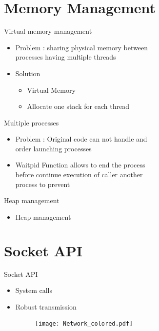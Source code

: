 \documentclass{beamer}
\begin{document}
\section{Memory Management}
\begin{frame}{Virtual memory management}
  \begin{itemize}
	\item Problem : sharing physical memory between 
	\\processes having multiple threads
    \item Solution  
    \begin{itemize}
    \item Virtual Memory 
    \item Allocate one stack for each thread
  \end{itemize}
\end{itemize}
  
\end{frame}
\begin{frame}{Multiple processes}
  \begin{itemize}
	\item Problem : Original code can not handle and
	\\order launching processes
    \item Waitpid Function allows to end the process 
    \\before continue execution of caller another
    \\process to prevent
    
  \end{itemize}
\end{frame}
\begin{frame}{Heap management}
  \begin{itemize}
    \item Heap management
  \end{itemize}
\end{frame}

\section{Socket API}
\begin{frame}{Socket API}
  \begin{itemize}
    \item System calls  
    \item Robust transmission
    \begin{figure}[ht]
		\texttt{[image: Network\_colored.pdf]}
    \end{figure}
  \end{itemize}
\end{frame}
\end{document}
